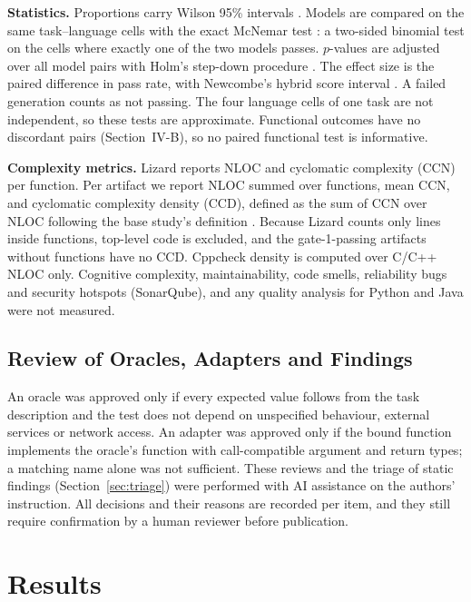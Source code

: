 \documentclass[conference]{IEEEtran}
\begin{document}
\textbf{Statistics.} Proportions carry Wilson 95\% intervals \cite{wilson1927}.
Models are compared on the same \nPairCells{} task--language cells with the
exact McNemar test \cite{mcnemar1947}: a two-sided binomial test on the cells
where exactly one of the two models passes. $p$-values are adjusted over all
\nPairs{} model pairs with Holm's step-down procedure \cite{holm1979}. The effect
size is the paired difference in pass rate, with Newcombe's hybrid score
interval \cite{newcombe1998}. A failed generation counts as not passing. The
four language cells of one task are not independent, so these tests are
approximate. Functional outcomes have no discordant pairs (Section~IV-B), so no
paired functional test is informative.

\textbf{Complexity metrics.} Lizard reports NLOC and cyclomatic complexity (CCN)
per function. Per artifact we report NLOC summed over functions, mean CCN, and
cyclomatic complexity density (CCD), defined as the sum of CCN over NLOC
following the base study's definition \cite{kharma2026}. Because Lizard counts
only lines inside functions, top-level code is excluded, and the \nNoFunctions{}
gate-1-passing artifacts without functions have no CCD. Cppcheck density is
computed over C/C++ NLOC only. Cognitive complexity, maintainability, code
smells, reliability bugs and security hotspots (SonarQube), and any quality
analysis for Python and Java were not measured.

\subsection{Review of Oracles, Adapters and Findings}
\label{sec:audit}
An oracle was approved only if every expected value follows from the task
description and the test does not depend on unspecified behaviour, external
services or network access. An adapter was approved only if the bound function
implements the oracle's function with call-compatible argument and return
types; a matching name alone was not sufficient. These reviews and the triage
of static findings (Section~\ref{sec:triage}) were performed with AI assistance
on the authors' instruction. All decisions and their reasons are recorded per
item, and they still require confirmation by a human reviewer
before publication.

\section{Results}
\end{document}
